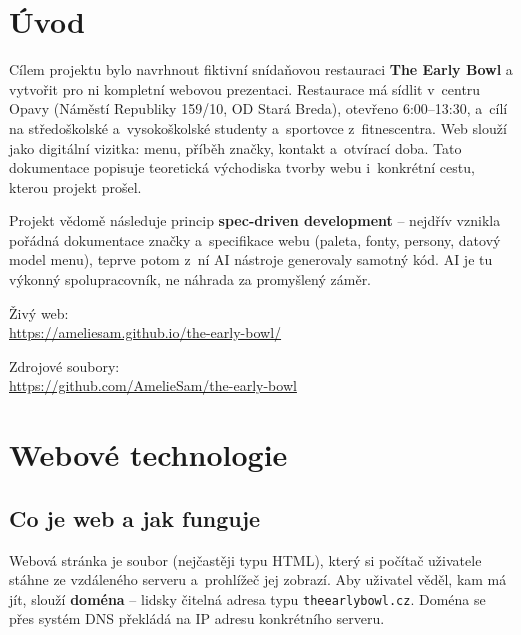 \documentclass[12pt,a4paper]{article}
\newcommand{\blankpage}{\newpage\thispagestyle{front}\null\newpage}
\begin{document}
\blankpage

\thispagestyle{front}
\tableofcontents
\newpage

\section*{Úvod}

Cílem projektu bylo navrhnout fiktivní snídaňovou restauraci \textbf{The Early Bowl} a vytvořit pro ni kompletní webovou prezentaci. Restaurace má sídlit v~centru Opavy (Náměstí Republiky 159/10, OD Stará Breda), otevřeno 6:00--13:30, a~cílí na středoškolské a~vysokoškolské studenty a~sportovce z~fitnescentra. Web slouží jako digitální vizitka: menu, příběh značky, kontakt a~otvírací doba. Tato dokumentace popisuje teoretická východiska tvorby webu i~konkrétní cestu, kterou projekt prošel.

Projekt vědomě následuje princip \textbf{spec-driven development} -- nejdřív vznikla pořádná dokumentace značky a~specifikace webu (paleta, fonty, persony, datový model menu), teprve potom z~ní AI nástroje generovaly samotný kód. AI je tu výkonný spolupracovník, ne náhrada za promyšlený záměr.

Živý web:\\
\url{https://ameliesam.github.io/the-early-bowl/}

\noindent Zdrojové soubory:\\
\url{https://github.com/AmelieSam/the-early-bowl}

\section{Webové technologie}

\subsection{Co je web a jak funguje}

Webová stránka je soubor (nejčastěji typu HTML), který si počítač uživatele stáhne ze vzdáleného serveru a~prohlížeč jej zobrazí. Aby uživatel věděl, kam má jít, slouží \textbf{doména} -- lidsky čitelná adresa typu \texttt{theearlybowl.cz}. Doména se přes systém DNS překládá na IP adresu konkrétního serveru.
\end{document}
